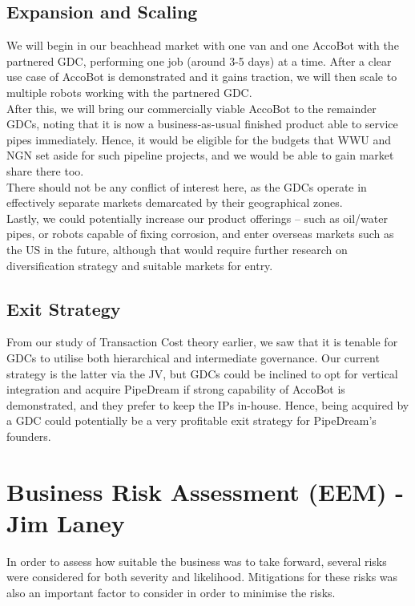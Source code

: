 \documentclass[11pt]{article}		%
\begin{document}
	\subsection{Expansion and Scaling}
	We will begin in our beachhead market with one van and one AccoBot with the partnered GDC, performing one job (around 3-5 days) at a time. After a clear use case of AccoBot is demonstrated and it gains traction, we will then scale to multiple robots working with the partnered GDC.
    \\ \hspace*{3ex}After this, we will bring our commercially viable AccoBot to the remainder GDCs, noting that it is now a business-as-usual finished product able to service pipes immediately. Hence, it would be eligible for the budgets that WWU and NGN set aside for such pipeline projects, and we would be able to gain market share there too. 
    \\ \hspace*{3ex}There should not be any conflict of interest here, as the GDCs operate in effectively separate markets demarcated by their geographical zones. 
    \\ \hspace*{3ex}Lastly, we could potentially increase our product offerings – such as oil/water pipes, or robots capable of fixing corrosion, and enter overseas markets such as the US in the future, although that would require further research on diversification strategy and suitable markets for entry. 

	\subsection{Exit Strategy}
	From our study of Transaction Cost theory earlier, we saw that it is tenable for GDCs to utilise both hierarchical and intermediate governance. Our current strategy is the latter via the JV, but GDCs could be inclined to opt for vertical integration and acquire PipeDream if strong capability of AccoBot is demonstrated, and they prefer to keep the IPs in-house. Hence, being acquired by a GDC could potentially be a very profitable exit strategy for PipeDream’s founders. 
	
	\section[Business Risk Assessment - EEM]{Business Risk Assessment (EEM) - Jim Laney}
     	
     	In order to assess how suitable the business was to take forward, several risks were considered for both severity and likelihood. 
     	Mitigations for these risks was also an important factor to consider in order to minimise the risks.
     	
\end{document}
